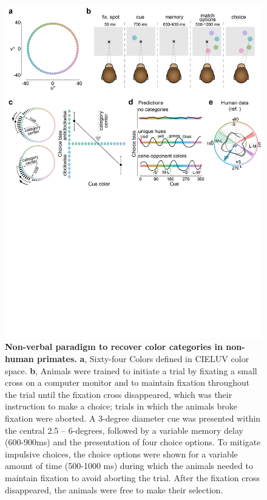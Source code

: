\begin{figure}
    \begin{fullwidth}
    \centering
    \includegraphics[width=\textwidth+4cm,trim={0 12.5cm 0 0},clip]{../Figures/flat/F1_ParadigmPredictions_6.jpg}
    \caption{\textbf{Non-verbal paradigm to recover color categories in non-human primates.}
    \textbf{a}, Sixty-four Colors defined in CIELUV color space. 
	\textbf{b}, Animals were trained to initiate a trial by fixating a small cross on a computer monitor and to maintain fixation throughout the trial until the fixation cross disappeared, which was their instruction to make a choice; trials in which the animals broke fixation were aborted. 
	A 3-degree diameter cue was presented within the central 2.5 – 6-degrees, followed by a variable memory delay (600-900ms) and the presentation of four choice options. 
	To mitigate impulsive choices, the choice options were shown for a variable amount of time (500-1000 ms) during which the animals needed to maintain fixation to avoid aborting the trial. After the fixation cross disappeared, the animals were free to make their selection. 
}
\end{fullwidth}
\end{figure}
